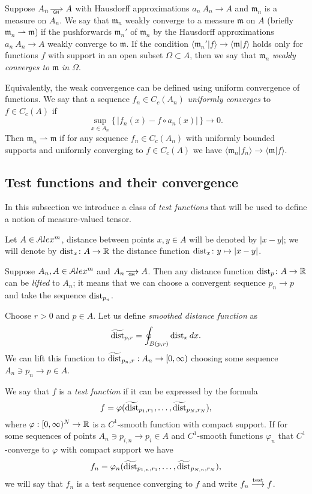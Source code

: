 Suppose $A_n\GHto A$ with Hausdorff approximations $a_n\:A_n\to A$ and
$\mathfrak m_n$ is a measure on $A_n$.
We say that $\mathfrak m_n$ weakly converge to a measure $\mathfrak m$ on $A$ (briefly $\mathfrak m_n\rightharpoonup \mathfrak m$) if the pushforwards $\mathfrak m_n'$ of $\mathfrak m_n$  by the Hausdorff approximations $a_n\:A_n\to A$ weakly converge to 
$\mathfrak m$.
If the condition $\langle \mathfrak m_n'|f\rangle \to \langle \mathfrak m|f\rangle $ holds only for functions $f$ with support in an open subset $\Omega\subset A$, then we say that $\mathfrak m_n$ \emph{weakly converges to $\mathfrak m$ in $\Omega$}.

Equivalently, the weak convergence can be defined using uniform convergence of functions.
We say that  a sequence $f_n\in C_c(A_n)$
\emph{uniformly converges} to $f\in C_c(A)$
if 
\[\sup_{x\in A_n}\{\,|f_n(x)-f\circ a_n(x)|\,\}\to 0.\]
Then  $\mathfrak m_n\rightharpoonup \mathfrak m$
if for any sequence $f_n\in C_c(A_n)$
with uniformly bounded supports and
uniformly converging to $f\in C_c(A)$
we have $\langle \mathfrak m_n|f_n\rangle \to \langle \mathfrak m|f\rangle $.


\subsection{Test functions and their convergence}

In this subsection we introduce a class of \emph{test functions} that will be used to define  a notion of measure-valued tensor.

Let $A\in \mathcal{A}lex^m$, distance between points $x,y\in A$ will be denoted by $|x-y|$;
we will denote by $\operatorname{\rm dist}_x\colon A\to \mathbb{R}$ the distance function $\operatorname{\rm dist}_x\colon y\mapsto |x-y|$.

Suppose $A_n, A\in \mathcal{A}lex^m$ and  $A_n\GHto A$.
Then any distance function $\dist_p\:A\zz\to\RR$ can be \emph{lifted} to $A_n$;
it means that we can choose a convergent sequence $p_n\to p$ and take the
sequence $\operatorname{\rm dist}_{p_n}$.

Choose $r>0$ and $p\in A$.
Let us define \emph{smoothed distance function} as 
$$\widetilde{\operatorname{\rm dist}}_{p,r} =\oint_{B(p,r)} \operatorname{\rm dist}_{x}dx.$$ 
We can lift this function to
$\widetilde{\operatorname{\rm dist}}_{p_n,r}:A_n\to [0,\infty)$
choosing some  sequence $A_n\ni p_n\to p\in A$.

We say that $f$ is a \emph{test function} if it can be expressed by the formula
$$f=\varphi( \widetilde{\operatorname{\rm dist}}_{p_1,r_1}, \dots,   \widetilde{\operatorname{\rm dist}}_{p_N,r_N}),$$
where $\varphi:[0,\infty)^N\to\mathbb{R}$ is a $C^1$-smooth function with compact support.
If for some sequences of points $A_n\ni p_{i,n}\to p_i\in A$ and $C^1$-smooth functions $\varphi_n$ that $C^1$-converge to $\varphi$ with compact support we have
$$f_n=\varphi_n( \widetilde{\operatorname{\rm dist}}_{p_{1,n},r_1},\dots,   \widetilde{\operatorname{\rm dist}}_{p_{N,n},r_N}),$$
we will say that $f_n$ is a test sequence converging to $f$ and write $f_n\stackrel{\tiny\rm test}{\longrightarrow} f$.

